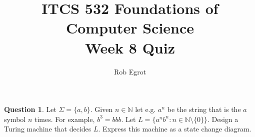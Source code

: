 \documentclass{article}
\title{ITCS 532 Foundations of Computer Science\\
Week 8 Quiz}
\author{Rob Egrot}
\date{}
\theoremstyle{definition}
\newtheorem{Q}{Question}
\newcommand{\bbN}{\mathbb{N}}
\begin{document}
\maketitle

\begin{Q}
Let $\Sigma = \{a,b\}$. Given $n\in \bbN$ let e.g. $a^n$ be the string that is the $a$ symbol $n$ times. For example, $b^3 = bbb$. Let $L=\{a^nb^n:n\in \bbN\setminus\{0\}\}$. Design a Turing machine that decides $L$. Express this machine as a state change diagram.  
\end{Q}
\begin{comment}
\textbf{Solution}
Undefined transitions can be considered to lead to the reject state. The idea is that $a$ is expected as the first symbol. If the 1st symbol is not $a$ then the machine rejects immediately. If it is $a$ then the machine erases it then looks for the last symbol, which it expects to be a $b$. If it is not a $b$ then the machine rejects. If it is a $b$ then the machine erases it and looks for the first non-blank symbol, which it expects to be $a$. If it is $a$ it erases it then looks for the last symbol, which it expects to be $b$, etc. This process of erasing the first $a$ and the last $b$ repeats. If the string has the right form then the machine will end up erasing the whole input and accepting. If it is not the right form then it will not see an $a$ or $b$ at some point when it expects to, and so will reject. Note that this algorithm could be made more efficient at the cost of a more complicated Turing machine.
\begin{center}
\begin{tikzpicture}[scale=0.2]
\tikzstyle{every node}+=[inner sep=0pt]
\draw [black] (7.5,-14) circle (3);
\draw (7.5,-14) node {$q_0$};
\draw [black] (20.2,-14) circle (3);
\draw (20.2,-14) node {$q_1$};
\draw [black] (20.2,-3.6) circle (3);
\draw (20.2,-3.6) node {$R$};
\draw [black] (20.2,-3.6) circle (2.4);
\draw [black] (31.8,-14) circle (3);
\draw (31.8,-14) node {$q_2$};
\draw [black] (43.7,-14) circle (3);
\draw (43.7,-14) node {$q_3$};
\draw [black] (55.3,-14) circle (3);
\draw (55.3,-14) node {$q_4$};
\draw [black] (68.4,-14) circle (3);
\draw (68.4,-14) node {$q_5$};
\draw [black] (68.4,-29.3) circle (3);
\draw (68.4,-29.3) node {$q_6$};
\draw [black] (20.2,-29.3) circle (3);
\draw (20.2,-29.3) node {$A$};
\draw [black] (20.2,-29.3) circle (2.4);
\draw [black] (31.8,-29.3) circle (3);
\draw (31.8,-29.3) node {$q_7$};
\draw [black] (10.5,-14) -- (17.2,-14);
\fill [black] (17.2,-14) -- (16.4,-13.5) -- (16.4,-14.5);

\end{comment}
\end{document}
